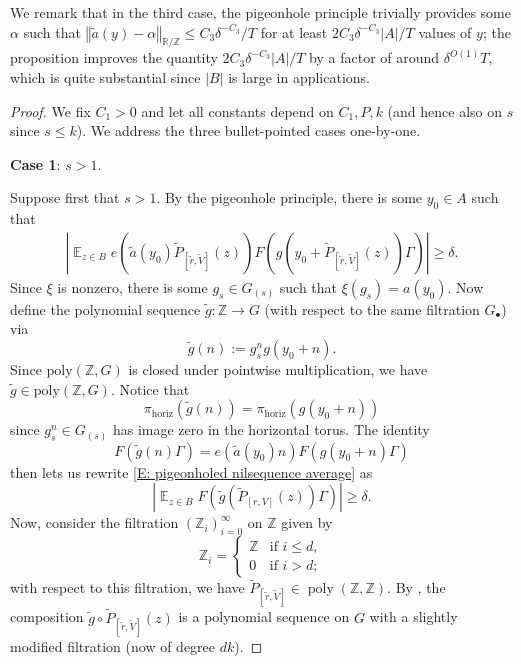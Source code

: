 \documentclass[11pt]{amsart}
\theoremstyle{definition}
\DeclareMathOperator*{\E}{\mathbb{E}}
\newcommand{\norm}[1]{\left\Vert #1\right\Vert}
\DeclareMathOperator{\poly}{poly}
\newcommand{\abs}[1]{\mathopen{}\left| #1\mathclose{}\right|}
\begin{document}
We remark that in the third case, the pigeonhole principle trivially provides some $\alpha$ such that $\norm{\widetilde a(y)-\alpha}_{\mathbb{R}/\mathbb{Z}} \leq C_3\delta^{-C_3}/T$ for at least $2C_3\delta^{-C_3}|A|/T$ values of $y$; the proposition improves the quantity $2C_3\delta^{-C_3}|A|/T$ by a factor of around $\delta^{O(1)}T$, which is quite substantial since $|B|$ is large in applications.
\begin{proof}
We fix $C_1>0$ and let all constants depend on $C_1, P, k$ (and hence also on $s$ since $s\leq k$). We address the three bullet-pointed cases one-by-one.

\smallskip
{\textbf{Case 1}: $s > 1$.}
\smallskip

Suppose first that $s>1$. By the pigeonhole principle, there is some $y_0 \in A$ such that
    \begin{align}\label{E: pigeonholed nilsequence average}
        \abs{\E_{z \in B} e(\tilde{a}(y_0)\widetilde{P}_{[\tilde{r}, \tilde{V}]}(z))F(g(y_0 + \widetilde{P}_{[\tilde{r}, \tilde{V}]}(z))\Gamma)} \ge \delta.
    \end{align}
Since $\xi$ is nonzero, there is some $g_s \in G_{(s)}$ such that $\xi(g_s)=a(y_0)$.  Now define the polynomial sequence $\tilde g: \mathbb{Z} \to G$ (with respect to the same filtration $G_\bullet$) via
$$\tilde g(n):=g_s^n g(y_0+n).$$
Since $\mathrm{poly}(\mathbb{Z}, G)$ is closed under pointwise multiplication, we have $\tilde{g} \in \mathrm{poly}(\mathbb{Z}, G)$. Notice that
$$\pi_{\mathrm{horiz}}(\tilde g(n))=\pi_{\mathrm{horiz}}(g(y_0+n))$$
since $g_s^n \in G_{(s)}$ has image zero in the horizontal torus. The identity $$F(\tilde g(n)\Gamma)=e(\tilde{a}(y_0)n)F(g(y_0+n)\Gamma)$$ then lets us rewrite \eqref{E: pigeonholed nilsequence average} as
$$\abs{\E_{z \in B} F(\tilde g(\widetilde P_{[r,V]}(z))\Gamma)} \geq \delta.$$
Now, consider the filtration $(\mathbb{Z}_i)_{i=0}^\infty$ on $\mathbb{Z}$ given by
\[\mathbb{Z}_i = \begin{cases}
\mathbb{Z} & \text{if $i \le d$}, \\
0 & \text{if $i > d$};
\end{cases}\]
with respect to this filtration, we have $\widetilde{P}_{[\tilde{r}, \tilde{V}]} \in \poly(\mathbb{Z},\mathbb{Z})$.  By \cite[Theorem 1.6.9]{T12}, the composition $\tilde{g} \circ \widetilde{P}_{[\tilde{r}, \tilde{V}]}(z)$ is a polynomial sequence on $G$ with a slightly modified filtration (now of degree $dk$).


\end{proof}
\end{document}
